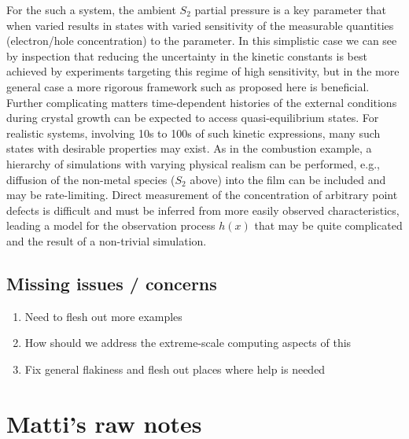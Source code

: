 \documentclass[11pt]{article}
\begin{document}
For the such a system, the ambient $S_2$ partial pressure is a key
parameter that when varied results in states with varied sensitivity
of the measurable quantities (electron/hole concentration) to the
parameter. In this simplistic case we can see by inspection that
reducing the uncertainty in the kinetic constants is best achieved by
experiments targeting this regime of high sensitivity, but in the more
general case a more rigorous framework such as proposed here is
beneficial. Further complicating matters time-dependent histories of
the external conditions during crystal growth can be expected to
access quasi-equilibrium states. For realistic systems, involving 10s
to 100s of such kinetic expressions, many such states with desirable
properties may exist.  As in the combustion example, a hierarchy of
simulations with varying physical realism can be performed, e.g.,
diffusion of the non-metal species ($S_2$ above) into the film can be
included and may be rate-limiting.  Direct measurement of the
concentration of arbitrary point defects is difficult and must be
inferred from more easily observed characteristics, leading a model
for the observation process $h(x)$ that may be quite complicated and
the result of a non-trivial simulation.


\subsection*{Missing issues / concerns}

\begin{enumerate}
\item Need to flesh out more examples
\item How should we address the extreme-scale computing aspects of this
\item Fix general flakiness and flesh out places where help is needed
\end{enumerate}

\newpage

\section*{Matti's raw notes}
\end{document}

